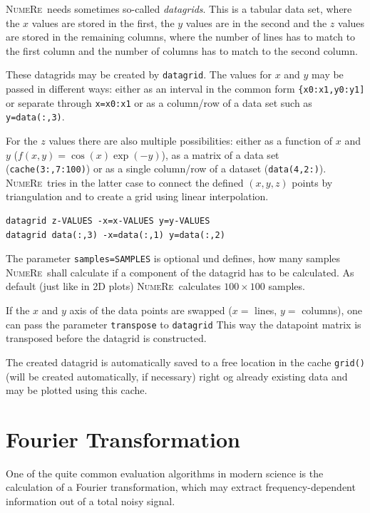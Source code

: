 \documentclass[DIV=14,headsepline,footsepline]{scrbook}
\newcommand{\NR}{\textsc{Nu\-me\-Re}}
\begin{document}
				\NR\ needs sometimes so-called \emph{datagrids}. This is a tabular data set, where the $x$ values are stored in the first, the $y$ values are in the second and the $z$ values are stored in the remaining columns, where the number of lines has to match to the first column and the number of columns has to match to the second column.
				
				These datagrids may be created by \verb+datagrid+. The values for $x$ and $y$ may be passed in different ways: either as an interval in the common form \verb+{x0:x1,y0:y1]+ or separate through \verb+x=x0:x1+ or as a column/row of a data set such as \verb+y=data(:,3)+.
				
				For the $z$ values there are also multiple possibilities: either as a function of $x$ and $y$ ($f(x,y) = \cos(x)\exp(-y)$), as a matrix of a data set (\verb+cache(3:,7:100)+) or as a single column/row of a dataset (\verb+data(4,2:)+). \NR\ tries in the latter case to connect the defined $(x,y,z)$ points by triangulation and to create a grid using linear interpolation.
				\begin{lstlisting}
datagrid z-VALUES -x=x-VALUES y=y-VALUES
datagrid data(:,3) -x=data(:,1) y=data(:,2)
				\end{lstlisting}
				
				The parameter \verb+samples=SAMPLES+ is optional und defines, how many samples \NR\ shall calculate if a component of the datagrid has to be calculated. As default (just like in 2D plots) \NR\ calculates $100\times100$ samples.
				
				If the $x$ and $y$ axis of the data points are swapped ($x =$ lines, $y=$ columns), one can pass the parameter \verb+transpose+ to \verb+datagrid+ This way the datapoint matrix is transposed before the datagrid is constructed.
	
				The created datagrid is automatically saved to a free location in the cache \verb+grid()+ (will be created automatically, if necessary) right og already existing data and may be plotted using this cache.
				
			\section{Fourier Transformation}
				One of the quite common evaluation algorithms in modern science is the calculation of a Fourier transformation, which may extract frequency-dependent information out of a total noisy signal.
				
\end{document}
